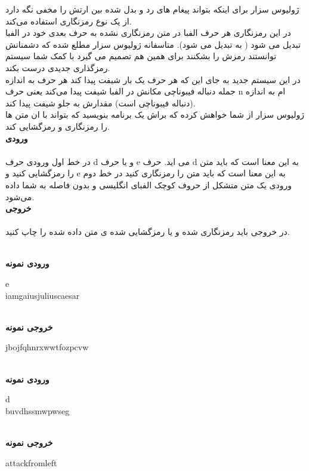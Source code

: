 \documentclass[]{article}
\newcommand{\inputsample}[1]{
    ~\\
    \textbf{ورودی نمونه}
    ~\\
    \begin{tcolorbox}[breakable,boxrule=0pt]
        \begin{latin}
            \large{
                #1
            }
        \end{latin}
    \end{tcolorbox}
}
\newcommand{\outputsample}[1]{
    ~\\
    \textbf{خروجی نمونه}

    \begin{tcolorbox}[breakable,boxrule=0pt]
        \begin{latin}
            \large{
                #1
            }
        \end{latin}
    \end{tcolorbox}
}
\begin{document}
 ژولیوس سزار برای اینکه بتواند پیغام های رد و بدل شده بین ارتش را مخفی نگه دارد از یک نوع رمزنگاری استفاده می‌کند.\\
در این رمزنگاری هر حرف الفبا در متن رمزنگاری نشده به حرف بعدی خود در الفبا تبدیل می شود ( به  تبدیل می شود). متاسفانه ژولیوس سزار مطلع شده که دشمنانش توانستند رمزش را بشکنند برای همین هم تصمیم می گیرد با کمک شما سیستم رمزگذاری جدیدی درست بکند.\\
در این سیستم جدید به جای این که هر حرف یک بار شیفت پیدا کند هر حرف به اندازه جمله دنباله فیبوناچی مکانش در الفبا شیفت پیدا می‌کند یعنی حرف n ام به اندازه   (دنباله فیبوناچی است) مقدارش به جلو شیفت پیدا کند.\\
ژولیوس سزار از شما خواهش کرده که براش یک برنامه بنویسید که بتواند با ان متن ها را رمزنگاری و رمزگشایی کند.
\\

\textbf{ورودی}
\\\\
در خط اول ورودی حرف d و یا حرف e می اید. حرف d به این معنا است که باید متن را رمزگشایی کنید و e به این معنا است که باید متن را رمزنگاری کنید
در خط دوم ورودی یک متن متشکل از حروف کوچک الفبای انگلیسی و بدون فاصله به شما داده می‌شود.
\\

\textbf{خروجی}
\\\\
در خروجی باید رمزنگاری شده و یا رمزگشایی شده ی متن داده شده را چاپ کنید. 
\\
\newpage
\inputsample{
e
\\
iamgaiusjuliuscaesar
}

\outputsample{
jbojfqhnrxwwtfozpcvw
}
\inputsample{
d
\\
buvdhssmwpwseg
}

\outputsample{
attackfromleft
}

\newpage
\end{document}
